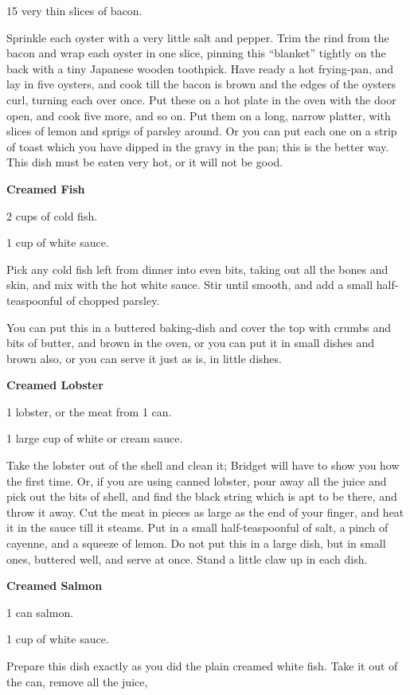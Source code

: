 \documentclass[11pt]{book}
\newcommand{\indpar}{\par\noindent\hspace*{\parindent}}
\newcommand{\ingredient}{\indpar}
\newcommand{\instruction}{\indpar}
\newenvironment{RecipeTitle}{\medskip\begin{center}\large\bf }{\end{center}\smallskip}
\begin{document}
\ingredient  15 very thin slices of bacon.
\instruction
  Sprinkle each oyster with a very little salt and pepper.
Trim the rind from the bacon and wrap each oyster in one
slice, pinning this ``blanket'' tightly on the back with a
tiny Japanese wooden toothpick.  Have ready a hot frying-pan,
and lay in five oysters, and cook till the bacon is brown
and the edges of the oysters curl, turning each over once.
Put these on a hot plate in the oven with the door open,
and cook five more, and so on.  Put them on a long, narrow
platter, with slices of lemon and sprigs of parsley around.
Or you can put each one on a strip of toast which you have
dipped in the gravy in the pan; this is the better way.
This dish must be eaten very hot, or it will not be good.
\begin{RecipeTitle}
Creamed Fish\label{creamed_fish}
\end{RecipeTitle}
\ingredient  2 cups of cold fish.
\ingredient  1 cup of white sauce.
\instruction
  Pick any cold fish left from dinner into even bits, taking
out all the bones and skin, and mix with the hot white sauce.
$\!$Stir until smooth, and add a small half-teaspoonful of
chopped parsley.
\instruction
  You can put this in a buttered baking-dish and cover the
top with crumbs and bits of butter, and brown in the oven,
or you can put it in small dishes and brown also, or you can
serve it just as is, in little dishes.
\begin{RecipeTitle}
Creamed Lobster\label{creamed_lobster}
\end{RecipeTitle}
\ingredient  1 lobster, or the meat from 1 can.
\ingredient  1 large cup of white or cream sauce.
\instruction
  Take the lobster out of the shell and clean it;  Bridget
will have to show you how the first time.  Or, if you are
using canned lobster, pour away all the juice and pick out
the bits of shell, and find the black string which is apt
to be there, and throw it away.  Cut the meat in pieces
as large as the end of your finger, and heat it in the
sauce till it steams.  Put in a small half-teaspoonful of
salt, a pinch of cayenne, and a squeeze of lemon.  Do not
put this in a large dish, but in small ones, buttered well,
and serve at once.  Stand a little claw up in each dish.
\begin{RecipeTitle}
Creamed Salmon\label{creamed_salmon}
\end{RecipeTitle}
\ingredient  1 can salmon.
\ingredient  1 cup of white sauce.
\instruction
  Prepare this dish exactly as you did the plain creamed
white fish.  Take it out of the can, remove all the juice,
\end{document}
